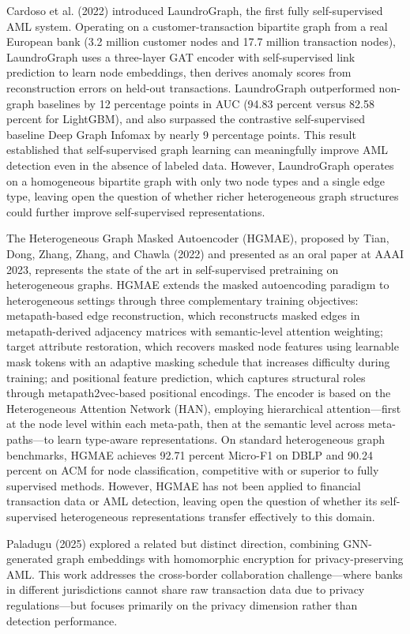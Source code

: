 \documentclass[12pt,a4paper]{article}
\begin{document}
Cardoso et al. (2022) introduced LaundroGraph, the first fully self-supervised AML system. Operating on a customer-transaction bipartite graph from a real European bank (3.2 million customer nodes and 17.7 million transaction nodes), LaundroGraph uses a three-layer GAT encoder with self-supervised link prediction to learn node embeddings, then derives anomaly scores from reconstruction errors on held-out transactions. LaundroGraph outperformed non-graph baselines by 12 percentage points in AUC (94.83 percent versus 82.58 percent for LightGBM), and also surpassed the contrastive self-supervised baseline Deep Graph Infomax by nearly 9 percentage points. This result established that self-supervised graph learning can meaningfully improve AML detection even in the absence of labeled data. However, LaundroGraph operates on a homogeneous bipartite graph with only two node types and a single edge type, leaving open the question of whether richer heterogeneous graph structures could further improve self-supervised representations.

The Heterogeneous Graph Masked Autoencoder (HGMAE), proposed by Tian, Dong, Zhang, Zhang, and Chawla (2022) and presented as an oral paper at AAAI 2023, represents the state of the art in self-supervised pretraining on heterogeneous graphs. HGMAE extends the masked autoencoding paradigm to heterogeneous settings through three complementary training objectives: metapath-based edge reconstruction, which reconstructs masked edges in metapath-derived adjacency matrices with semantic-level attention weighting; target attribute restoration, which recovers masked node features using learnable mask tokens with an adaptive masking schedule that increases difficulty during training; and positional feature prediction, which captures structural roles through metapath2vec-based positional encodings. The encoder is based on the Heterogeneous Attention Network (HAN), employing hierarchical attention---first at the node level within each meta-path, then at the semantic level across meta-paths---to learn type-aware representations. On standard heterogeneous graph benchmarks, HGMAE achieves 92.71 percent Micro-F1 on DBLP and 90.24 percent on ACM for node classification, competitive with or superior to fully supervised methods. However, HGMAE has not been applied to financial transaction data or AML detection, leaving open the question of whether its self-supervised heterogeneous representations transfer effectively to this domain.

Paladugu (2025) explored a related but distinct direction, combining GNN-generated graph embeddings with homomorphic encryption for privacy-preserving AML. This work addresses the cross-border collaboration challenge---where banks in different jurisdictions cannot share raw transaction data due to privacy regulations---but focuses primarily on the privacy dimension rather than detection performance.
\end{document}

